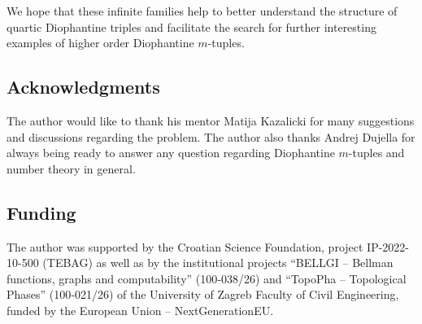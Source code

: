 \documentclass{amsart}
\begin{document}
We hope that these infinite families help to better understand the structure of quartic Diophantine triples and facilitate the search for further interesting examples of higher order Diophantine $m$-tuples.

\subsection*{Acknowledgments}
The author would like to thank his mentor Matija Kazalicki for many suggestions and discussions regarding the problem. The author also thanks Andrej Dujella for always being ready to answer any question regarding Diophantine $m$-tuples and number theory in general.

\subsection*{Funding}
The author was supported by the Croatian Science Foundation,
project IP-2022-10-500 (TEBAG) as well as by the institutional projects “BELLGI – Bellman functions, graphs and computability” (100‑038/26) and “TopoPha – Topological Phases” (100‑021/26) of the University of Zagreb Faculty of Civil Engineering, funded by the European Union – NextGenerationEU.

\printbibliography
\end{document}
